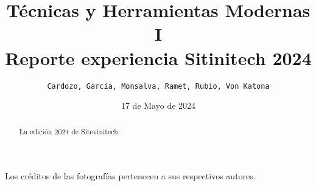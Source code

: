 \documentclass[letterpaper,12pt]{article} %
\newcommand{\myMateria}{Técnicas y Herramientas Modernas I}
\newcommand{\MyReport}{Reporte experiencia Sitinitech 2024}
\newcommand{\myDate}{17 de Mayo de 2024}
\newcommand{\myName}{Cardozo, García, Monsalva, Ramet, Rubio, Von Katona}
\begin{document}
    
    \newpage
    \tableofcontents
    \newpage

\title{\myMateria \\\textbf{\MyReport} \\ } 

\author{ \normalsize{\texttt{\myName}} }
\date{\myDate}
\maketitle
\thispagestyle{fancy}

\begin{abstract}
La edición 2024 de Sitevinitech 
\end{abstract}




\nocite{*}




\centering \small Los créditos de las fotografías pertenecen a sus respectivos autores.

\centering\vspace*{\fill} 
\end{document}
